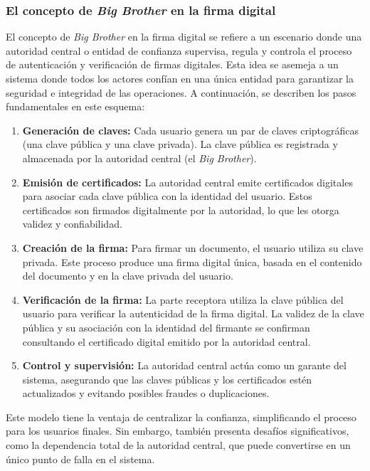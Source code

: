 \documentclass[a4paper,12pt]{article}
\begin{document}
\subsubsection{El concepto de \textit{Big Brother} en la firma digital}

El concepto de \textit{Big Brother} en la firma digital se refiere a un escenario donde una autoridad central o entidad de confianza supervisa, regula y controla el proceso de autenticación y verificación de firmas digitales. Esta idea se asemeja a un sistema donde todos los actores confían en una única entidad para garantizar la seguridad e integridad de las operaciones. A continuación, se describen los pasos fundamentales en este esquema:

\begin{enumerate}
    \item \textbf{Generación de claves:} Cada usuario genera un par de claves criptográficas (una clave pública y una clave privada). La clave pública es registrada y almacenada por la autoridad central (el \textit{Big Brother}).
    \item \textbf{Emisión de certificados:} La autoridad central emite certificados digitales para asociar cada clave pública con la identidad del usuario. Estos certificados son firmados digitalmente por la autoridad, lo que les otorga validez y confiabilidad.
    \item \textbf{Creación de la firma:} Para firmar un documento, el usuario utiliza su clave privada. Este proceso produce una firma digital única, basada en el contenido del documento y en la clave privada del usuario.
    \item \textbf{Verificación de la firma:} La parte receptora utiliza la clave pública del usuario para verificar la autenticidad de la firma digital. La validez de la clave pública y su asociación con la identidad del firmante se confirman consultando el certificado digital emitido por la autoridad central.
    \item \textbf{Control y supervisión:} La autoridad central actúa como un garante del sistema, asegurando que las claves públicas y los certificados estén actualizados y evitando posibles fraudes o duplicaciones.
\end{enumerate}

Este modelo tiene la ventaja de centralizar la confianza, simplificando el proceso para los usuarios finales. Sin embargo, también presenta desafíos significativos, como la dependencia total de la autoridad central, que puede convertirse en un único punto de falla en el sistema.
\newpage
\end{document}
